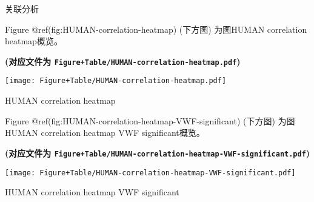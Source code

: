 \documentclass[
  ignorenonframetext,
]{beamer}
\begin{document}
\begin{frame}[fragile]{关联分析}
\protect\hypertarget{ux5173ux8054ux5206ux6790}{}
\begin{center}\vspace{1.5cm}\end{center}

Figure @ref(fig:HUMAN-correlation-heatmap) (下方图) 为图HUMAN
correlation heatmap概览。

\textbf{(对应文件为
\texttt{Figure+Table/HUMAN-correlation-heatmap.pdf})}

\def\@captype{figure}
\begin{center}
\texttt{[image: Figure+Table/HUMAN-correlation-heatmap.pdf]}
\caption{HUMAN correlation heatmap}\label{fig:HUMAN-correlation-heatmap}
\end{center}

\begin{center}\vspace{1.5cm}\end{center}

\begin{center}\vspace{1.5cm}\end{center}

Figure @ref(fig:HUMAN-correlation-heatmap-VWF-significant) (下方图)
为图HUMAN correlation heatmap VWF significant概览。

\textbf{(对应文件为
\texttt{Figure+Table/HUMAN-correlation-heatmap-VWF-significant.pdf})}

\def\@captype{figure}
\begin{center}
\texttt{[image: Figure+Table/HUMAN-correlation-heatmap-VWF-significant.pdf]}
\caption{HUMAN correlation heatmap VWF significant}\label{fig:HUMAN-correlation-heatmap-VWF-significant}
\end{center}

\begin{center}\vspace{1.5cm}\end{center}

\begin{center}\vspace{1.5cm}\end{center}


\end{frame}
\end{document}
